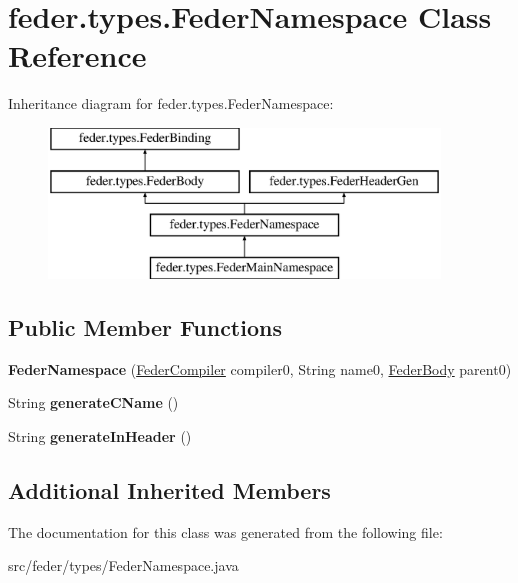 \hypertarget{classfeder_1_1types_1_1FederNamespace}{}\section{feder.\+types.\+Feder\+Namespace Class Reference}
\label{classfeder_1_1types_1_1FederNamespace}
Inheritance diagram for feder.\+types.\+Feder\+Namespace\+:\begin{figure}[H]
\begin{center}
\leavevmode
\includegraphics[height=4.000000cm]{classfeder_1_1types_1_1FederNamespace}
\end{center}
\end{figure}
\subsection*{Public Member Functions}
\begin{DoxyCompactItemize}
\item 
\mbox{\label{classfeder_1_1types_1_1FederNamespace_a8e56d5fadf40b301143cf9303b945608}} 
{\bfseries Feder\+Namespace} (\hyperlink{classfeder_1_1FederCompiler}{Feder\+Compiler} compiler0, String name0, \hyperlink{classfeder_1_1types_1_1FederBody}{Feder\+Body} parent0)
\item 
\mbox{\label{classfeder_1_1types_1_1FederNamespace_ac8c1560fe99728182db8bfc334827a25}} 
String {\bfseries generate\+C\+Name} ()
\item 
\mbox{\label{classfeder_1_1types_1_1FederNamespace_a1ba6fd322c097dd392c26df468d27aea}} 
String {\bfseries generate\+In\+Header} ()
\end{DoxyCompactItemize}
\subsection*{Additional Inherited Members}


The documentation for this class was generated from the following file\+:\begin{DoxyCompactItemize}
\item 
src/feder/types/Feder\+Namespace.\+java\end{DoxyCompactItemize}

